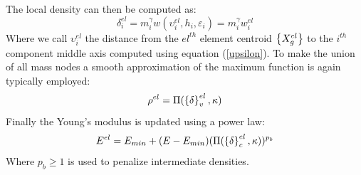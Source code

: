 The local density can then be computed as:
\begin{equation}
     \delta^{el}_i=m_i^\gamma w(\upsilon^{el}_i,h_i,\varepsilon_i)=m_i^\gamma w_i^{el}
\end{equation}
Where we call  $\upsilon^{el}_i$ the distance from the $el^{th}$ element centroid $\left\{{X_g^{el}}\right\}$ to the $i^{th}$ component middle axis computed using equation (\ref{upsilon}).
To make the union of all mass nodes a smooth approximation of the maximum function is again typically employed:
\begin{equation}
    \rho^{el}=\Pi(\left\{{\delta}\right\}_v^{el},\kappa)
\end{equation}
Finally the Young's modulus is updated using a power law:
\begin{equation}
    E^{el}=E_{min} + (E-E_{min})(\Pi(\left\{{\delta}\right\}_c^{el},\kappa))^{p_b}
\end{equation}
Where $p_b\geq1$ is used to penalize intermediate densities.
